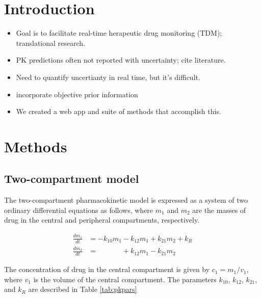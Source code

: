 \documentclass{article}
\begin{document}

\section{Introduction}
\begin{itemize}
\item Goal is to facilitate real-time herapeutic drug monitoring (TDM); translational research.
\item PK predictions often not reported with uncertainty; cite literature.
\item Need to quantify uncertianty in real time, but it's difficult.
\item incorporate objective prior information
\item We created a web app and suite of methods that accomplish this.
\end{itemize}

\section{Methods}
\subsection{Two-compartment model}
The two-compartment pharmacokinetic model is expressed as a system of two ordinary differential equations as follows, where $m_1$ and $m_2$ are the masses of drug in the central and peripheral compartments, respectively.

\begin{align}
\frac{dm_1}{dt} &= -k_{10}m_1 - k_{12}m_1 + k_{21}m_2 + k_R \nonumber \\
\frac{dm_2}{dt} &= \phantom{-k_{10}m_1} + k_{12}m_1 - k_{21}m_2 \nonumber
\end{align}

The concentration of drug in the central compartment is given by $c_1 = m_1/v_1$, where $v_1$ is the volume of the central compartment. The parameters $k_{10}$, $k_{12}$, $k_{21}$, and $k_R$ are described in Table \ref{tab:pkpars}
\end{document}
